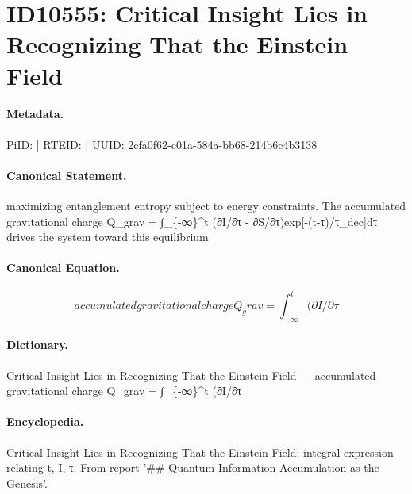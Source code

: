 \section*{ID10555: Critical Insight Lies in Recognizing That the Einstein Field}
\paragraph{Metadata.}
PiID:  | RTEID:  | UUID: 2cfa0f62-c01a-584a-bb68-214b6c4b3138

\paragraph{Canonical Statement.}
maximizing entanglement entropy subject to energy constraints. The accumulated gravitational charge Q\_grav = ∫\_\{-∞\}\textasciicircum{}t (∂I/∂τ - ∂S/∂τ)exp[-(t-τ)/τ\_dec]dτ drives the system toward this equilibrium

\paragraph{Canonical Equation.}
\[
accumulated gravitational charge Q_grav = ∫_{-∞}^t (∂I/∂τ
\]

\paragraph{Dictionary.}
Critical Insight Lies in Recognizing That the Einstein Field — accumulated gravitational charge Q\_grav = ∫\_\{-∞\}\textasciicircum{}t (∂I/∂τ

\paragraph{Encyclopedia.}
Critical Insight Lies in Recognizing That the Einstein Field: integral expression relating t, I, τ. From report '\#\# Quantum Information Accumulation as the Genesis'.
